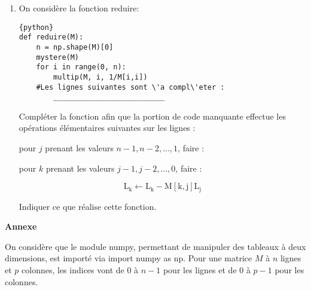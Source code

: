 \documentclass[a4paper, 11pt,reqno]{article}
\begin{document}
\begin{exercice} 
\begin{enumerate}
\begin{enumerate}
\item On considère dans cette question l'algorithme mystere appliqué à la matrice \[M_{1}=\left(\begin{array}{ccc}3 & 2 & 2 \\ -6 & 0 & 12 \\ 1 & 1 & -3\end{array}\right)\] Indiquer combien de fois la ligne print (M) est exécutée ainsi que les différentes valeurs qu'elle affiche
\item De façon générale, que réalise cet algorithme?
\end{enumerate} 
\item On considère la fonction reduire:
\begin{lstlisting}{python}
def reduire(M):
    n = np.shape(M)[0]
    mystere(M)
    for i in range(0, n):
        multip(M, i, 1/M[i,i])
    #Les lignes suivantes sont \'a compl\'eter :
        __________________________        
\end{lstlisting}
Compléter la fonction afin que la portion de code manquante effectue les opérations élémentaires suivantes sur les lignes :

pour $j$ prenant les valeurs $n-1, n-2, \ldots, 1$, faire :


\hspace{2cm}	pour $k$ prenant les valeurs $j-1, j-2, \ldots, 0$, faire :

$$
\mathrm{L}_{\mathrm{k}} \leftarrow \mathrm{L}_{\mathrm{k}}-\mathrm{M}[\mathrm{k}, \mathrm{j}] \mathrm{L}_{\mathrm{j}}
$$



Indiquer ce que réalise cette fonction.
\end{enumerate}

\begin{center}
\textbf{\huge{Annexe}}
\end{center}
On considère que le module numpy, permettant de manipuler des tableaux à deux dimensions, est importé via import numpy as np. Pour une matrice $M$ à $n$ lignes et $p$ colonnes, les indices vont de 0 à $n-1$ pour les lignes et de 0 à $p-1$ pour les colonnes.


\end{exercice}
\end{document}
